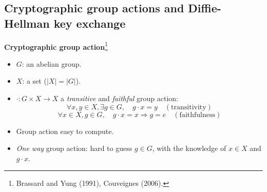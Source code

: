 \documentclass[10pt]{beamer}
\theoremstyle{plain}
\theoremstyle{definition}
\renewcommand{\(}{\left(}
\renewcommand{\)}{\right)}
\begin{document}
\subsection{Cryptographic group actions and Diffie-Hellman key exchange}


\begin{frame}
\textbf{Cryptographic group action}\footnote[frame]{Brassard and Yung (1991), Couveignes (2006).}

\vspace{0.5cm}

\begin{itemize}
\item $G$: an abelian group.
\item $X$: a set ($|X|=|G|$).
\pause 
\item $\cdot : G\times X\longrightarrow X$ a \emph{transitive} and \emph{faithful} group action:
\[\forall x,y\in X, \exists g\in G, \quad g\cdot x=y \quad (\mbox{transitivity})\]
\[\forall x\in X,  g\in G, \quad g\cdot x=x \Longrightarrow g=e \quad (\mbox{faithfulness})\]
\pause
\item Group action easy to compute.
\item \emph{One way} group action: hard to guess $g\in G$, with the knowledge of $x\in X$ and $g\cdot x$.
\end{itemize}

\end{frame}
\end{document}
